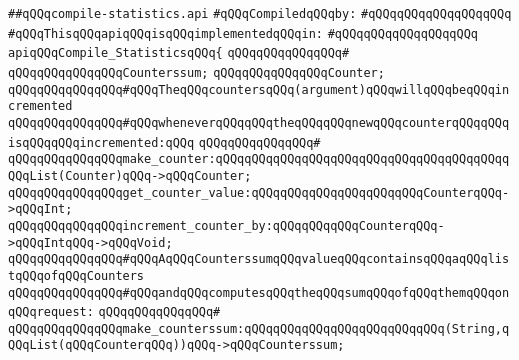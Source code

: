 \label{src/lib/compiler/front/basics/stats/compile-statistics.api}
\verb|##qQQqcompile-statistics.api|\newline
\newline
\verb|#qQQqCompiledqQQqby:|\newline
\verb|#qQQqqQQqqQQqqQQqqQQq|\newline
\newline
\verb|#qQQqThisqQQqapiqQQqisqQQqimplementedqQQqin:|\newline
\verb|#qQQqqQQqqQQqqQQqqQQq|\newline
\newline
\verb|apiqQQqCompile_StatisticsqQQq{|\newline
\verb|qQQqqQQqqQQqqQQq#|\newline
\verb|qQQqqQQqqQQqqQQqCounterssum;|\newline
\verb|qQQqqQQqqQQqqQQqCounter;|\newline
\newline
\verb|qQQqqQQqqQQqqQQq#qQQqTheqQQqcountersqQQq(argument)qQQqwillqQQqbeqQQqincremented|\newline
\verb|qQQqqQQqqQQqqQQq#qQQqwheneverqQQqqQQqtheqQQqqQQqnewqQQqcounterqQQqqQQqisqQQqqQQqincremented:qQQq|\newline
\verb|qQQqqQQqqQQqqQQq#|\newline
\verb|qQQqqQQqqQQqqQQqmake_counter:qQQqqQQqqQQqqQQqqQQqqQQqqQQqqQQqqQQqqQQqqQQqList(Counter)qQQq->qQQqCounter;|\newline
\verb|qQQqqQQqqQQqqQQqget_counter_value:qQQqqQQqqQQqqQQqqQQqqQQqCounterqQQq->qQQqInt;|\newline
\verb|qQQqqQQqqQQqqQQqincrement_counter_by:qQQqqQQqqQQqCounterqQQq->qQQqIntqQQq->qQQqVoid;|\newline
\newline
\verb|qQQqqQQqqQQqqQQq#qQQqAqQQqCounterssumqQQqvalueqQQqcontainsqQQqaqQQqlistqQQqofqQQqCounters|\newline
\verb|qQQqqQQqqQQqqQQq#qQQqandqQQqcomputesqQQqtheqQQqsumqQQqofqQQqthemqQQqonqQQqrequest:|\newline
\verb|qQQqqQQqqQQqqQQq#|\newline
\verb|qQQqqQQqqQQqqQQqmake_counterssum:qQQqqQQqqQQqqQQqqQQqqQQqqQQq(String,qQQqList(qQQqCounterqQQq))qQQq->qQQqCounterssum;|\newline
